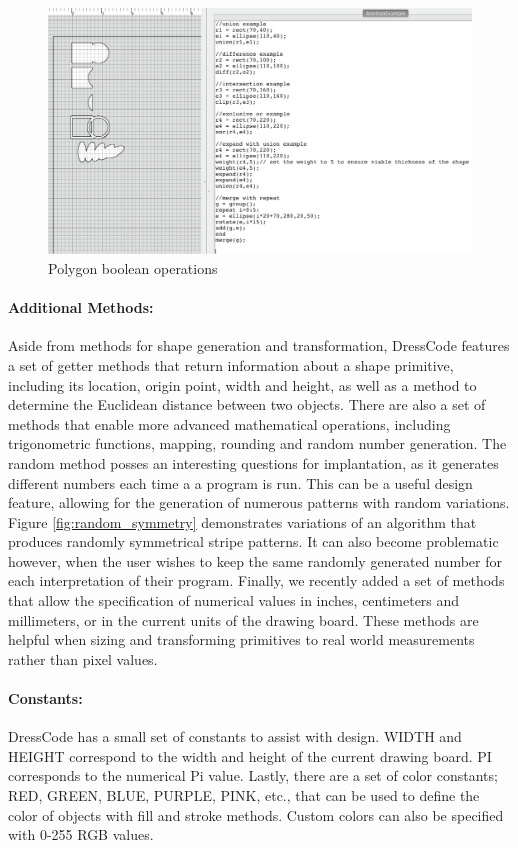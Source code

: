  \begin{center}
\begin{figure}[h!]
\includegraphics[width=6.5in]{images/boolean.png}
\caption{Polygon boolean operations}
\label{fig:boolean}
\end{figure}
\end{center} 
\paragraph{Additional Methods:}
Aside from methods for shape generation and transformation, DressCode features a set of getter methods that return information about a shape primitive, including its location, origin point, width and height, as well as a method to determine the Euclidean distance between two objects. There are also a set of methods that enable more advanced mathematical operations, including trigonometric functions, mapping, rounding and random number generation. The random method posses an interesting questions for implantation, as it generates different numbers each time a a program is run. This can be a useful design feature, allowing for the generation of numerous patterns with random variations. Figure \ref{fig:random_symmetry} demonstrates variations of an algorithm that produces randomly symmetrical stripe patterns.  It can also become problematic however, when the user wishes to keep the same randomly generated number for each interpretation of their program.  Finally, we recently added a set of methods that allow the specification of numerical values in inches, centimeters and millimeters, or in the current units of the drawing board. These methods are helpful when sizing and transforming primitives to real world measurements rather than pixel values.  

\paragraph{Constants:}
DressCode has a small set of constants to assist with design. WIDTH and HEIGHT correspond to the width and height of the current drawing board. PI corresponds to the numerical Pi value. Lastly, there are a set of color constants; RED, GREEN, BLUE, PURPLE, PINK, etc., that can be used to define the color of objects with fill and stroke methods. Custom colors can also be specified with 0-255 RGB values. 

